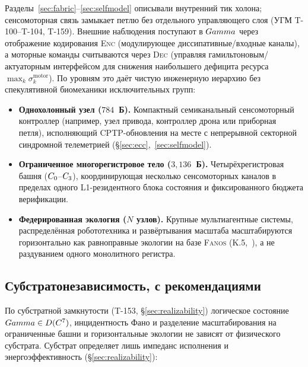 Разделы~\ref{sec:fabric}--\ref{sec:selfmodel} описывали внутренний тик холона;
сенсомоторная связь замыкает петлю без отдельного управляющего слоя (УГМ
T-100--T-104, T-159). Внешние наблюдения поступают в $Gamma$ через отображение
кодирования \textsc{Enc} (модулирующее диссипативные/входные каналы), а
моторные команды считываются через \textsc{Dec} (управляя гамильтоновым/актуаторным
интерфейсом для снижения наибольшего дефицита ресурса
$\max_k\sigma^{\mathrm{motor}}_k$). По уровням это даёт чистую инженерную
иерархию без спекулятивной биомеханики исключительных групп:
\begin{itemize}[leftmargin=1.5em,itemsep=1pt]
  \item \textbf{Однохолонный узел ($784$~Б).} Компактный семиканальный
        сенсомоторный контроллер (например, узел привода, контроллер дрона или
        приборная петля), исполняющий CPTP-обновления на месте с непрерывной
        секторной синдромной телеметрией (\S\ref{sec:ecc},~\ref{sec:selfmodel}).
  \item \textbf{Ограниченное многорегистровое тело ($3{,}136$~Б).}
        Четырёхрегистровая башня ($C_0$--$C_3$), координирующая несколько
        сенсомоторных каналов в пределах одного L1-резидентного блока состояния и
        фиксированного бюджета верификации.
  \item \textbf{Федерированная экология ($N$ узлов).} Крупные мультиагентные
        системы, распределённая робототехника и развёртывания масштаба \SYNARC{}
        масштабируются горизонтально как равноправные экологии на базе
        \textsc{Fanos} (K.5,~\cite{synarc2026}), а не раздуванием одного
        монолитного регистра.
\end{itemize}

\subsection{Субстратонезависимость, с рекомендациями}
\label{subsec:substrate-ladder}

По субстратной замкнутости (T-153, \S\ref{sec:realizability}) логическое
состояние $Gamma\in D(C^7)$, инцидентность Фано и разделение
масштабирования на ограниченные башни и горизонтальные экологии не зависят от
физического субстрата. Субстрат определяет лишь импеданс исполнения и
энергоэффективность (\S\ref{sec:realizability}):

